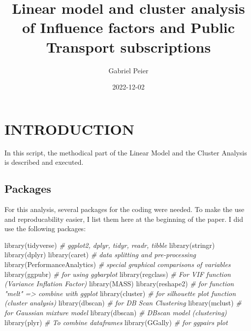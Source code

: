 \documentclass[
]{article}
\title{Linear model and cluster analysis of Influence factors and Public
Transport subscriptions}
\author{Gabriel Peier}
\date{2022-12-02}
\newenvironment{Shaded}{\begin{snugshade}}{\end{snugshade}}
\newcommand{\CommentTok}[1]{\textcolor[rgb]{0.56,0.35,0.01}{\textit{#1}}}
\newcommand{\FunctionTok}[1]{\textcolor[rgb]{0.00,0.00,0.00}{#1}}
\newcommand{\NormalTok}[1]{#1}
\begin{document}
\maketitle

\graphicspath{ {G:/My Drive/MasterThesis/Scripts/Outputs}}

\hypertarget{introduction}{%
\section{INTRODUCTION}\label{introduction}}

In this script, the methodical part of the Linear Model and the Cluster
Analysis is described and executed.

\hypertarget{packages}{%
\subsection{Packages}\label{packages}}

For this analysis, several packages for the coding were needed. To make
the use and reproducability easier, I list them here at the beginning of
the paper. I did use the following packages:

\begin{Shaded}
\begin{Highlighting}[]
\FunctionTok{library}\NormalTok{(tidyverse)             }\CommentTok{\# ggplot2, dplyr, tidyr, readr, tibble}
\FunctionTok{library}\NormalTok{(stringr)}
\FunctionTok{library}\NormalTok{(dplyr)}
\FunctionTok{library}\NormalTok{(caret)                 }\CommentTok{\# data splitting and pre{-}processing}
\FunctionTok{library}\NormalTok{(PerformanceAnalytics)  }\CommentTok{\# special graphical comparisons of variables}
\FunctionTok{library}\NormalTok{(ggpubr)                }\CommentTok{\# for using ggbarplot}
\FunctionTok{library}\NormalTok{(regclass)              }\CommentTok{\# For VIF function (Variance Inflation Factor)}
\FunctionTok{library}\NormalTok{(MASS)}
\FunctionTok{library}\NormalTok{(reshape2)              }\CommentTok{\# for function "melt" =\textgreater{} combine with ggplot}
\FunctionTok{library}\NormalTok{(cluster)               }\CommentTok{\# for silhouette plot function (cluster analysis)}
\FunctionTok{library}\NormalTok{(dbscan)                }\CommentTok{\# for DB Scan Clustering}
\FunctionTok{library}\NormalTok{(mclust)                }\CommentTok{\# for Gaussian mixture model}
\FunctionTok{library}\NormalTok{(dbscan)                }\CommentTok{\# DBscan model (clustering)}
\FunctionTok{library}\NormalTok{(plyr)                  }\CommentTok{\# To combine dataframes}
\FunctionTok{library}\NormalTok{(GGally)                }\CommentTok{\# for ggpairs plot}
\end{Highlighting}
\end{Shaded}
\end{document}

